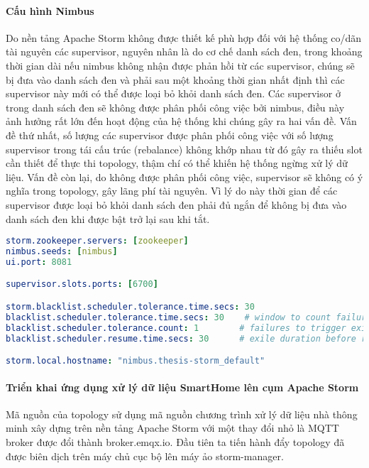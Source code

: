 \paragraph{Cấu hình Nimbus}

Do nền tảng Apache Storm không được thiết kế phù hợp đối với hệ thống co/dãn tài nguyên các supervisor, nguyên nhân là do cơ chế danh sách đen, trong khoảng thời gian dài nếu nimbus không nhận được phản hồi từ các supervisor, chúng sẽ bị đưa vào danh sách đen và phải sau một khoảng thời gian nhất định thì các supervisor này mới có thể được loại bỏ khỏi danh sách đen. Các supervisor ở trong danh sách đen sẽ không được phân phối công việc bởi nimbus, điều này ảnh hưởng rất lớn đến hoạt động của hệ thống khi chúng gây ra hai vấn đề. Vấn đề thứ nhất, số lượng các supervisor được phân phối công việc với số lượng supervisor trong tái cấu trúc (rebalance) không khớp nhau từ đó gây ra thiếu slot cần thiết để thực thi topology, thậm chí có thể khiến hệ thống ngừng xử lý dữ liệu. Vấn đề còn lại, do không được phân phối công việc, supervisor sẽ không có ý nghĩa trong topology, gây lãng phí tài nguyên. Vì lý do này thời gian để các supervisor được loại bỏ khỏi danh sách đen phải đủ ngắn để không bị đưa vào danh sách đen khi được bật trở lại sau khi tắt.

\begin{lstlisting}[language=yaml, caption={Cấu hình Nimbus node}]
storm.zookeeper.servers: [zookeeper]
nimbus.seeds: [nimbus]
ui.port: 8081

supervisor.slots.ports: [6700]

storm.blacklist.scheduler.tolerance.time.secs: 30
blacklist.scheduler.tolerance.time.secs: 30    # window to count failures
blacklist.scheduler.tolerance.count: 1        # failures to trigger exile
blacklist.scheduler.resume.time.secs: 30      # exile duration before return

storm.local.hostname: "nimbus.thesis-storm_default"
\end{lstlisting}

\paragraph{Triển khai ứng dụng xử lý dữ liệu SmartHome lên cụm Apache Storm}

Mã nguồn của topology sử dụng mã nguồn chương trình xử lý dữ liệu nhà thông minh xây dựng trên nền tảng Apache Storm \autocite{fimocodestormsmarthome} với một thay đổi nhỏ là MQTT broker được đổi thành broker.emqx.io. Đầu tiên ta tiến hành đẩy topology đã được biên dịch trên máy chủ cục bộ lên máy ảo storm-manager.

